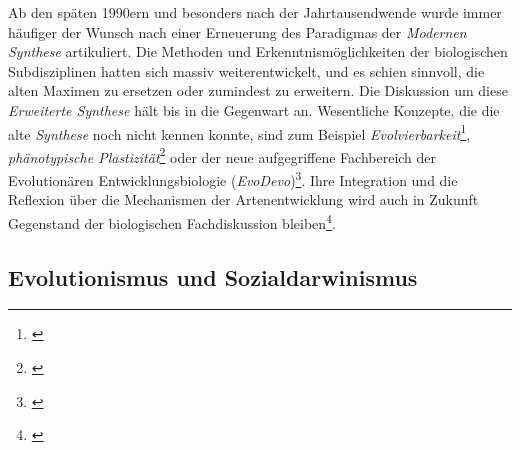 \documentclass[openany,twoside,twocolumn]{book}
\let\rmarkdownfootnote\footnote%
\def\footnote{\protect\rmarkdownfootnote}
\begin{document}
Ab den späten 1990ern und besonders nach der Jahrtausendwende wurde immer häufiger der Wunsch nach einer Erneuerung des Paradigmas der \emph{Modernen Synthese} artikuliert. Die Methoden und Erkenntnismöglichkeiten der biologischen Subdisziplinen hatten sich massiv weiterentwickelt, und es schien sinnvoll, die alten Maximen zu ersetzen oder zumindest zu erweitern. Die Diskussion um diese \emph{Erweiterte Synthese} hält bis in die Gegenwart an. Wesentliche Konzepte, die die alte \emph{Synthese} noch nicht kennen konnte, sind zum Beispiel \emph{Evolvierbarkeit}\footnote{\textcite{wagner_robustness_2013}}, \emph{phänotypische Plastizität}\footnote{\textcite{pigliucci_phenotypic_2001}} oder der neue aufgegriffene Fachbereich der Evolutionären Entwicklungsbiologie (\emph{EvoDevo})\footnote{\textcite{muller_evodevo_2007}}. Ihre Integration und die Reflexion über die Mechanismen der Artenentwicklung wird auch in Zukunft Gegenstand der biologischen Fachdiskussion bleiben\footnote{\textcite{pigliucci_elements_2010}}.

\hypertarget{evolutionismus-und-sozialdarwinismus}{%
\subsection{Evolutionismus und Sozialdarwinismus}\label{evolutionismus-und-sozialdarwinismus}}
\end{document}
